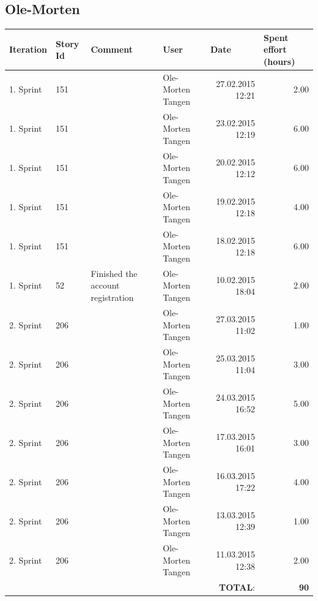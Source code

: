\documentclass[a4paper]{article}
\begin{document}
\begin{landscape}
\subsection{Ole-Morten}
\begin{tabular}{|l|l|l|l|r|r|}
\hline
\textbf{Iteration} & \textbf{Story Id} & \textbf{Comment} & \textbf{User} & \multicolumn{1}{l|}{\textbf{Date}} & \multicolumn{1}{l|}{\textbf{Spent effort (hours)}} \\ \hline
1. Sprint & 151 &  & Ole-Morten Tangen & 27.02.2015 12:21 & 2.00 \\ \hline
1. Sprint & 151 &  & Ole-Morten Tangen & 23.02.2015 12:19 & 6.00 \\ \hline
1. Sprint & 151 &  & Ole-Morten Tangen & 20.02.2015 12:12 & 6.00 \\ \hline
1. Sprint & 151 &  & Ole-Morten Tangen & 19.02.2015 12:18 & 4.00 \\ \hline
1. Sprint & 151 &  & Ole-Morten Tangen & 18.02.2015 12:18 & 6.00 \\ \hline
1. Sprint & 52 & Finished the account registration & Ole-Morten Tangen & 10.02.2015 18:04 & 2.00 \\ \hline
2. Sprint & 206 &  & Ole-Morten Tangen & 27.03.2015 11:02 & 1.00 \\ \hline
2. Sprint & 206 &  & Ole-Morten Tangen & 25.03.2015 11:04 & 3.00 \\ \hline
2. Sprint & 206 &  & Ole-Morten Tangen & 24.03.2015 16:52 & 5.00 \\ \hline
2. Sprint & 206 &  & Ole-Morten Tangen & 17.03.2015 16:01 & 3.00 \\ \hline
2. Sprint & 206 &  & Ole-Morten Tangen & 16.03.2015 17:22 & 4.00 \\ \hline
2. Sprint & 206 &  & Ole-Morten Tangen & 13.03.2015 12:39 & 1.00 \\ \hline
2. Sprint & 206 &  & Ole-Morten Tangen & 11.03.2015 12:38 & 2.00 \\ \hline
 & & & &\textbf{TOTAL}: & \textbf{90} \\ \hline
\end{tabular}




\end{landscape}
\end{document}
